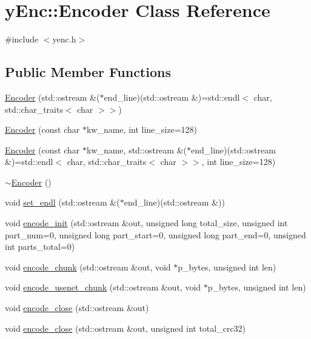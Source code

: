 \hypertarget{classy_enc_1_1_encoder}{}\section{y\+Enc\+:\+:Encoder Class Reference}
\label{classy_enc_1_1_encoder}


{\ttfamily \#include $<$yenc.\+h$>$}

\subsection*{Public Member Functions}
\begin{DoxyCompactItemize}
\item 
\hyperlink{classy_enc_1_1_encoder_a2a2083685e653b8ad1b21a95a864bce3}{Encoder} (std\+::ostream \&($\ast$end\+\_\+line)(std\+::ostream \&)=std\+::endl$<$ char, std\+::char\+\_\+traits$<$ char $>$$>$)
\item 
\hyperlink{classy_enc_1_1_encoder_a35fd881c16343781020c36028f832f26}{Encoder} (const char $\ast$kw\+\_\+name, int line\+\_\+size=128)
\item 
\hyperlink{classy_enc_1_1_encoder_a0ef468c9c0e7aa94c7fa03f8317ea924}{Encoder} (const char $\ast$kw\+\_\+name, std\+::ostream \&($\ast$end\+\_\+line)(std\+::ostream \&)=std\+::endl$<$ char, std\+::char\+\_\+traits$<$ char $>$$>$, int line\+\_\+size=128)
\item 
\hyperlink{classy_enc_1_1_encoder_a6c23dbd3910d1849e8287f3e83ae66b9}{$\sim$\+Encoder} ()
\item 
void \hyperlink{classy_enc_1_1_encoder_a73015158db830e91ba29bb9762a4ba1f}{set\+\_\+endl} (std\+::ostream \&($\ast$end\+\_\+line)(std\+::ostream \&))
\item 
void \hyperlink{classy_enc_1_1_encoder_adfb89ae4d9d5614098ad78ae436b12fa}{encode\+\_\+init} (std\+::ostream \&out, unsigned long total\+\_\+size, unsigned int part\+\_\+num=0, unsigned long part\+\_\+start=0, unsigned long part\+\_\+end=0, unsigned int parts\+\_\+total=0)
\item 
void \hyperlink{classy_enc_1_1_encoder_aeb909154ff90f955861d83aadbefa94e}{encode\+\_\+chunk} (std\+::ostream \&out, void $\ast$p\+\_\+bytes, unsigned int len)
\item 
void \hyperlink{classy_enc_1_1_encoder_ab0d4bf6c1509244c45b32376a1f14878}{encode\+\_\+usenet\+\_\+chunk} (std\+::ostream \&out, void $\ast$p\+\_\+bytes, unsigned int len)
\item 
void \hyperlink{classy_enc_1_1_encoder_ad8821346bf122c744cf813bc1bda519a}{encode\+\_\+close} (std\+::ostream \&out)
\item 
void \hyperlink{classy_enc_1_1_encoder_a270b6e16ca932db46cc81a829d94198e}{encode\+\_\+close} (std\+::ostream \&out, unsigned int total\+\_\+crc32)
\end{DoxyCompactItemize}
